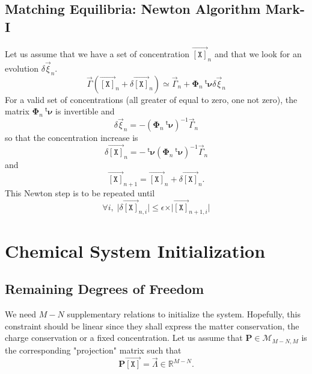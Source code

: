 \documentclass[aps,twocolumn]{revtex4}
\newcommand{\myconc}[1]{\left\lbrack #1 \right\rbrack}
\newcommand{\mychem}[1]{{\mathtt{#1}}}
\newcommand{\mymat}[1]{\boldsymbol{#1}}
\newcommand{\mytrn}[1]{{\!\!~^{\mathsf{t}}{#1}}}
\newcommand{\myvec}[1]{\overrightarrow{#1}}
\newcommand{\vecX}{\myvec{\myconc{\mychem{X}}}}
\begin{document}
\subsection{Matching Equilibria: Newton Algorithm Mark-I}
Let us assume that we have a set of concentration $\vecX_{n}$ and that we look for an evolution $\delta\vec{\xi}_{n}$.
\begin{equation}
	\vec{\Gamma}\left(\vecX_{n}+\delta\vecX_{n}\right) \simeq \vec{\Gamma}_{n} + \mymat{\Phi}_n \mytrn{\mymat{\nu}} \delta\vec{\xi}_n
\end{equation}
For a valid set of concentrations (all greater of equal to zero, one not zero), the matrix $\mymat{\Phi}_n \mytrn{\mymat{\nu}}$ is invertible
and
\begin{equation}
	\delta\vec{\xi}_n = -\left(\mymat{\Phi}_n \mytrn{\mymat{\nu}}\right)^{-1} \vec{\Gamma}_{n}
\end{equation}
so that the concentration increase is
\begin{equation}
	\delta\vecX_{n} = - \mytrn{\mymat{\nu}}\left(\mymat{\Phi}_n \mytrn{\mymat{\nu}}\right)^{-1} \vec{\Gamma}_{n}
\end{equation}
and
\begin{equation}
	\vecX_{n+1} = \vecX_{n} + \delta\vecX_{n}.
\end{equation}
This Newton step is to be repeated until
\begin{equation}
	\forall i, \; \vert\delta\vecX_{n,i}\vert \leq \epsilon \times \vert\vecX_{n+1,i}\vert
\end{equation}

\section{Chemical System Initialization}
\subsection{Remaining Degrees of Freedom}
We need $M-N$ supplementary relations to initialize the system. Hopefully, this constraint should be linear
since they shall express the matter conservation, the charge conservation or a fixed concentration.
Let us assume that $\mymat{P}\in\mathcal{M}_{M-N,M}$ is the corresponding "projection" matrix such that
\begin{equation}
	\mymat{P} \vecX = \vec{\Lambda} \in \mathbb{R}^{M-N}.
\end{equation}
\end{document}
